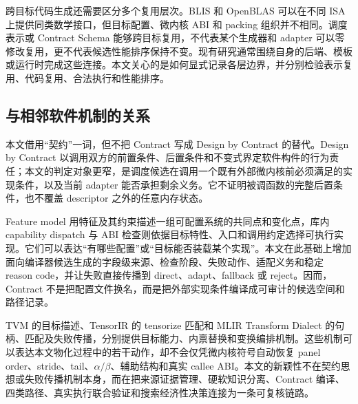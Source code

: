 跨目标代码生成还需要区分多个复用层次。BLIS 和 OpenBLAS 可以在不同 ISA 上提供同类数学接口，但目标配置、微内核 ABI 和 packing 组织并不相同\cite{VanZee2015BLIS,OpenMathLibOpenBLAS}。调度表示或 Contract Schema 能够跨目标复用，不代表某个生成器和 adapter 可以零修改复用，更不代表候选性能排序保持不变。现有研究通常围绕自身的后端、模板或运行时完成这些连接。本文关心的是如何显式记录各层边界，并分别检验表示复用、代码复用、合法执行和性能排序。

\subsection{与相邻软件机制的关系}

本文借用“契约”一词，但不把 Contract 写成 Design by Contract 的替代。Design by Contract 以调用双方的前置条件、后置条件和不变式界定软件构件的行为责任\cite{Meyer1992DesignByContract}；本文的判定对象更窄，是调度候选在调用一个既有外部微内核前必须满足的实现条件，以及当前 adapter 能否承担剩余义务。它不证明被调函数的完整后置条件，也不覆盖 descriptor 之外的任意内存状态。

Feature model 用特征及其约束描述一组可配置系统的共同点和变化点\cite{Kang1990FODA}，库内 capability dispatch 与 ABI 检查则依据目标特性、入口和调用约定选择可执行实现。它们可以表达“有哪些配置”或“目标能否装载某个实现”。本文在此基础上增加面向编译器候选生成的字段级来源、检查阶段、失败动作、适配义务和稳定 reason code，并让失败直接传播到 direct、adapt、fallback 或 reject。因而，Contract 不是把配置文件换名，而是把外部实现条件编译成可审计的候选空间和路径记录。

TVM 的目标描述、TensorIR 的 tensorize 匹配和 MLIR Transform Dialect 的句柄、匹配及失败传播，分别提供目标能力、内禀替换和变换编排机制\cite{Chen2018TVM,Feng2023TensorIR,LLVMProjectTransformDialect,Luecke2025TransformDialect}。这些机制可以表达本文物化过程中的若干动作，却不会仅凭微内核符号自动恢复 panel order、stride、tail、$\alpha/\beta$、辅助结构和真实 callee ABI。本文的新颖性不在契约思想或失败传播机制本身，而在把来源证据管理、硬软知识分离、Contract 编译、四类路径、真实执行联合验证和搜索经济性决策连接为一条可复核链路。

